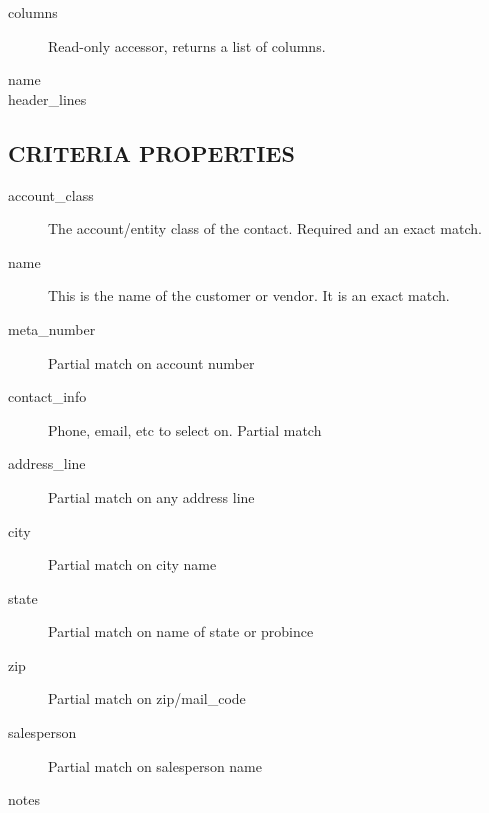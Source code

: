 \begin{description}
\begin{description}
\begin{description}
\begin{description}
\begin{description}
\begin{description}
\begin{description}
\begin{description}
\begin{description}
\begin{description}
\begin{description}
\item[{columns}] \mbox{}

Read-only accessor, returns a list of columns.


\item[{name}] \mbox{}
\item[{header\_lines}] \mbox{}\end{description}
\subsection*{CRITERIA PROPERTIES\label{LedgerSMB::DBObject::Report::Contact::History_CRITERIA_PROPERTIES}}
\begin{description}

\item[{account\_class}] \mbox{}

The account/entity class of the contact.  Required and an exact match.


\item[{name}] \mbox{}

This is the name of the customer or vendor.  It is an exact match.


\item[{meta\_number}] \mbox{}

Partial match on account number


\item[{contact\_info}] \mbox{}

Phone, email, etc to select on.  Partial match


\item[{address\_line}] \mbox{}

Partial match on any address line


\item[{city}] \mbox{}

Partial match on city name


\item[{state}] \mbox{}

Partial match on name of state or probince


\item[{zip}] \mbox{}

Partial match on zip/mail\_code


\item[{salesperson}] \mbox{}

Partial match on salesperson name


\item[{notes}] \mbox{}


\end{description}
\end{description}
\end{description}
\end{description}
\end{description}
\end{description}
\end{description}
\end{description}
\end{description}
\end{description}
\end{description}
